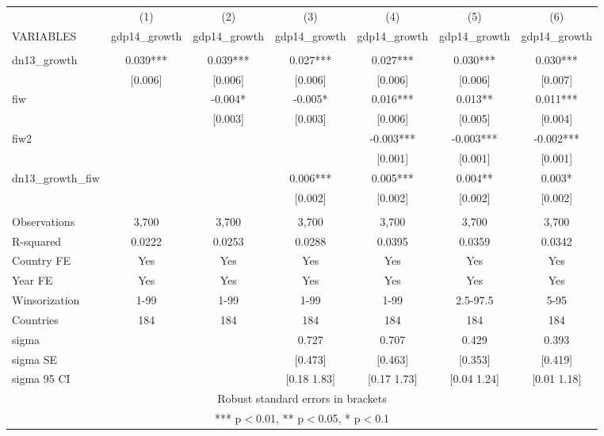 \begin{tabular}{lcccccc} \hline
 & (1) & (2) & (3) & (4) & (5) & (6) \\
VARIABLES & gdp14\_growth & gdp14\_growth & gdp14\_growth & gdp14\_growth & gdp14\_growth & gdp14\_growth \\ \hline
 &  &  &  &  &  &  \\
dn13\_growth & 0.039*** & 0.039*** & 0.027*** & 0.027*** & 0.030*** & 0.030*** \\
 & [0.006] & [0.006] & [0.006] & [0.006] & [0.006] & [0.007] \\
fiw &  & -0.004* & -0.005* & 0.016*** & 0.013** & 0.011*** \\
 &  & [0.003] & [0.003] & [0.006] & [0.005] & [0.004] \\
fiw2 &  &  &  & -0.003*** & -0.003*** & -0.002*** \\
 &  &  &  & [0.001] & [0.001] & [0.001] \\
dn13\_growth\_fiw &  &  & 0.006*** & 0.005*** & 0.004** & 0.003* \\
 &  &  & [0.002] & [0.002] & [0.002] & [0.002] \\
 &  &  &  &  &  &  \\
Observations & 3,700 & 3,700 & 3,700 & 3,700 & 3,700 & 3,700 \\
R-squared & 0.0222 & 0.0253 & 0.0288 & 0.0395 & 0.0359 & 0.0342 \\
Country FE & Yes & Yes & Yes & Yes & Yes & Yes \\
Year FE & Yes & Yes & Yes & Yes & Yes & Yes \\
Winsorization & 1-99 & 1-99 & 1-99 & 1-99 & 2.5-97.5 & 5-95 \\
Countries & 184 & 184 & 184 & 184 & 184 & 184 \\
sigma &  &  & 0.727 & 0.707 & 0.429 & 0.393 \\
sigma SE &  &  & [0.473] & [0.463] & [0.353] & [0.419] \\
 sigma 95 CI &  &  & [0.18 1.83] & [0.17 1.73] & [0.04 1.24] & [0.01 1.18] \\ \hline
\multicolumn{7}{c}{ Robust standard errors in brackets} \\
\multicolumn{7}{c}{ *** p$<$0.01, ** p$<$0.05, * p$<$0.1} \\
\end{tabular}
